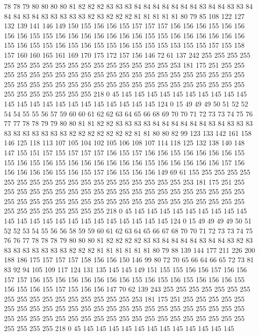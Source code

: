 78 78 79 80 80 80 80 81 82 82 82 83 83 83 84 84 84 84 84 84
84 83 84 84 83 83 84 84 84 83 84 83 83 83 83 83 82 83 82 82
82 81 81 81 81 81 80 79 85 108 122 127 132 139 141 146 149 150 155 156
156 155 157 157 157 156 156 156 155 156 156 156 156 155 155 156 156 156 156 156
156 156 155 155 156 156 156 156 156 156 155 156 155 155 156 155 156 155 155 156
155 155 155 153 155 155 157 155 158 157 160 160 165 161 169 170 175 172 157 156
146 72 61 137 242 255 255 255 255 255 255 255 255 255 255 255 255 255 255 255
255 255 253 181 175 251 255 255 255 255 255 255 255 255 255 255 255 255 255 255
255 255 255 255 255 255 255 255 255 255 255 255 255 255 255 255 255 255 255 255
255 255 255 255 255 255 255 255 255 255 255 255 255 218 0 45 145 145 145 145
145 145 145 145 145 145 145 145 145 145 145 145 145 145 145 145 145 145 124 0
15 49 49 49 50 51 52 52 54 54 55 55 56 57 59 60 60 61 62 62
63 64 65 66 68 69 70 70 71 72 73 73 74 75 76 77 77 78 78 79
79 80 80 81 81 82 82 83 83 83 83 84 84 84 84 84 84 83 84 83
83 83 83 83 83 83 83 83 83 82 82 82 82 82 82 82 81 81 80 80
82 99 123 133 142 161 158 146 125 118 113 107 105 104 102 105 106 108 107 114
118 125 132 138 140 148 147 155 151 157 155 157 157 157 156 155 157 156 156 155
156 156 156 156 155 155 156 155 156 155 156 156 156 156 156 156 155 156 156 156
156 156 157 156 156 156 156 156 155 156 155 157 156 155 156 156 149 69 61 155
255 255 255 255 255 255 255 255 255 255 255 255 255 255 255 255 255 255 253 181
175 251 255 255 255 255 255 255 255 255 255 255 255 255 255 255 255 255 255 255
255 255 255 255 255 255 255 255 255 255 255 255 255 255 255 255 255 255 255 255
255 255 255 255 255 255 255 255 255 218 0 45 145 145 145 145 145 145 145 145
145 145 145 145 145 145 145 145 145 145 145 145 145 145 124 0 15 49 49 49
49 50 51 52 52 53 54 55 56 56 58 59 59 60 61 62 63 64 65 66
67 68 70 70 71 72 73 73 74 75 76 76 77 78 78 78 79 80 80 80
81 82 82 82 82 83 83 84 84 84 84 83 84 84 83 82 83 83 83 83
83 83 83 83 82 82 82 81 81 81 81 81 81 80 79 88 139 144 177 211
226 200 188 186 175 157 157 157 158 156 156 150 146 99 80 72 70 65 66 64
66 65 72 73 81 83 92 94 105 109 117 124 131 135 145 145 149 151 155 155
156 156 157 156 156 157 157 156 155 156 156 156 156 156 156 155 156 155 156 155
156 156 156 155 156 155 156 155 157 155 156 156 147 70 62 139 243 255 255 255
255 255 255 255 255 255 255 255 255 255 255 255 255 255 253 181 175 251 255 255
255 255 255 255 255 255 255 255 255 255 255 255 255 255 255 255 255 255 255 255
255 255 255 255 255 255 255 255 255 255 255 255 255 255 255 255 255 255 255 255
255 255 255 255 255 218 0 45 145 145 145 145 145 145 145 145 145 145 145 145

